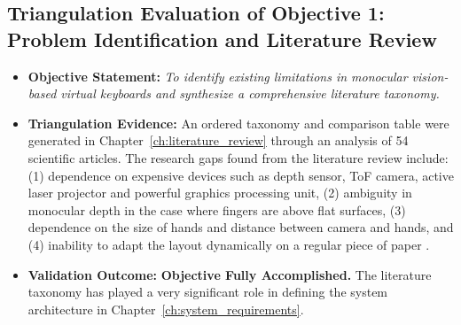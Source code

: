 \subsection{Triangulation Evaluation of Objective 1: Problem Identification and Literature Review}
\label{subsec:concl_obj1}
\begin{itemize}
    \item \textbf{Objective Statement:} \emph{To identify existing limitations in monocular vision-based virtual keyboards and synthesize a comprehensive literature taxonomy.}
    \item \textbf{Triangulation Evidence:} An ordered taxonomy and comparison table were generated in Chapter~\ref{ch:literature_review} through an analysis of 54 scientific articles. The research gaps found from the literature review include: (1) dependence on expensive devices such as depth sensor, ToF camera, active laser projector and powerful graphics processing unit, (2) ambiguity in monocular depth in the case where fingers are above flat surfaces, (3) dependence on the size of hands and distance between camera and hands, and (4) inability to adapt the layout dynamically on a regular piece of paper \cite{ReviewVirtualKeyboard2020, Ji2018Local, Posner2012Single}.
    \item \textbf{Validation Outcome:} \textbf{Objective Fully Accomplished.} The literature taxonomy has played a very significant role in defining the system architecture in Chapter~\ref{ch:system_requirements}.
\end{itemize}

